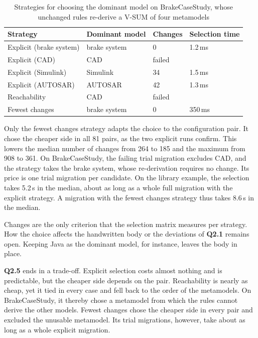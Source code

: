 \begin{table}[htbp]
    \centering
    \begin{tabular}{|l|l|l|l|}
        \hline
        \textbf{Strategy}       & \textbf{Dominant model} & \textbf{Changes} & \textbf{Selection time} \\
        \hline
        Explicit (brake system) & brake system            & 0                & 1.2\,ms                 \\
        \hline
        Explicit (CAD)          & CAD                     & failed           &                         \\
        \hline
        Explicit (Simulink)     & Simulink                & 34               & 1.5\,ms                 \\
        \hline
        Explicit (AUTOSAR)      & AUTOSAR                 & 42               & 1.3\,ms                 \\
        \hline
        Reachability            & CAD                     & failed           &                         \\
        \hline
        Fewest changes          & brake system            & 0                & 350\,ms                 \\
        \hline
    \end{tabular}
    \caption{Strategies for choosing the dominant model on BrakeCaseStudy, whose unchanged rules re-derive a V-SUM of four metamodels}
    \label{table:selection-strategies-brake}
\end{table}

Only the fewest changes strategy adapts the choice to the configuration pair.
It chose the cheaper side in all 81 pairs, as the two explicit runs confirm.
This lowers the median number of changes from 264 to 185 and the maximum from 908 to 361.
On BrakeCaseStudy, the failing trial migration excludes CAD, and the strategy takes the brake system, whose re-derivation requires no change.
Its price is one trial migration per candidate.
On the library example, the selection takes 5.2\,s in the median, about as long as a whole full migration with the explicit strategy.
A migration with the fewest changes strategy thus takes 8.6\,s in the median.

Changes are the only criterion that the selection matrix measures per strategy.
How the choice affects the handwritten body or the deviations of \textbf{Q2.1} remains open.
Keeping Java as the dominant model, for instance, leaves the body in place.

\textbf{Q2.5} ends in a trade-off.
Explicit selection costs almost nothing and is predictable, but the cheaper side depends on the pair.
Reachability is nearly as cheap, yet it tied in every case and fell back to the order of the metamodels.
On BrakeCaseStudy, it thereby chose a metamodel from which the rules cannot derive the other models.
Fewest changes chose the cheaper side in every pair and excluded the unusable metamodel.
Its trial migrations, however, take about as long as a whole explicit migration.

